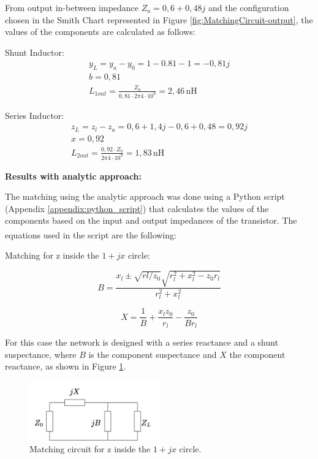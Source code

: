 From output in-between impedance $Z_a = 0,6+0,48j$ and the configuration chosen in the Smith Chart represented in Figure \ref{fig:MatchingCircuit-output}, the values of the components are calculated as follows:

\vspace{0.4cm}
Shunt Inductor:
\begin{equation}
    \begin{split}
        y_L = y_a - y_0 = 1-0.81- 1 = -0,81j\\
        b = 0,81 \\
        L_{1out} = \frac{Z_0}{0,81\cdot2\pi4\cdot10^9} = 2,46\,\si{\nano\henry}
    \end{split}
    \label{eq:OutputIndShunt}
\end{equation}

Series Inductor:
\begin{equation}
    \begin{split}
        z_L = z_l - z_a = 0,6 + 1,4j - 0,6 + 0,48 = 0,92j\\
        x = 0,92 \\
        L_{2out} = \frac{0,92\cdot Z_0}{2\pi4\cdot10^9} = 1,83\,\si{\nano\henry}
    \end{split}
    \label{eq:OutputInd}
\end{equation}

\vspace{0.4cm}
\textbf{Results with analytic approach:}
\vspace{0.4cm}

The matching using the analytic approach was done using a Python script (Appendix \ref{appendix:python_script}) that calculates the values of the components based on the input and output impedances of the transistor. The equations used in the script are the following\textsuperscript{\cite{Pozar}}:

Matching for z inside the $1+jx$ circle:

\begin{equation}
    B = \frac{x_l \pm \sqrt{rl/z_0}\sqrt{r_l^2 + x_l^2- z_0 r_l}}{r_l^2+ x_l^2}
\end{equation}

\begin{equation}
    X = \frac{1}{B}+\frac{x_l z_0}{r_l}-\frac{z_0}{Br_l}
\end{equation}

For this case the network is designed with a series reactance and a shunt suspectance, where $B$ is the component suspectance and $X$ the component reactance, as shown in Figure \ref{fig:inside-matching}.
\begin{figure}[H]
    \centering
    \includegraphics[width=0.5\textwidth]{Images/outside-matching.png}
    \caption{Matching circuit for z inside the $1+jx$ circle.}
    \label{fig:inside-matching}
\end{figure}

